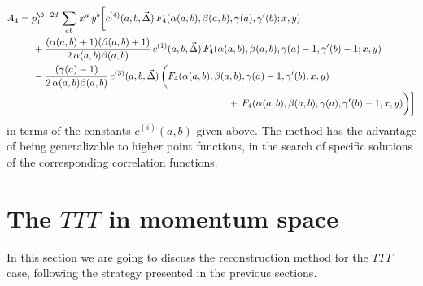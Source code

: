 \documentclass[a4paper,11pt,openright,twoside]{book}
\let\a=\alpha   \let\b=\beta   \let\g=\gamma   \let\d=\delta
\numberwithin{equation}{section}
\begin{document}
{{{\begin{align}
\end{align}
\begin{align}
	A_4&=p_1^{\D-2d}\,\sum_{ab}\,x^a\,y^b\bigg[c^{(4)}(a,b,\vec{\Delta})\,F_4(\a(a,b),\b(a,b),\g(a),\g'(b);x,y)\notag\\
	&\hspace{0.5cm}+\frac{(\a(a,b)+1)(\b(a,b)+1)}{2\,\a(a,b)\b(a,b)}\,c^{(1)}(a,b,\vec{\Delta})\,F_4(\a(a,b),\b(a,b),\g(a)-1,\g'(b)-1;x,y)\notag\\
	&\hspace{0.5cm}-\frac{(\g(a)-1)}{2\,\a(a,b)\b(a,b)}\,c^{(3)}(a,b,\vec{\Delta})\,\bigg(F_4(\alpha(a,b),\beta(a,b),\gamma(a)-1,\gamma'(b),x,y)\notag\\
	&\hspace{7.5cm}+\,F_4(\alpha(a,b),\beta(a,b),\gamma(a),\gamma'(b)-1,x,y)\bigg)
	\bigg]
\end{align}
in terms of the constants $c^{(i)}(a,b)$ given above. The method has the advantage of being generalizable to higher point functions, 
in the search of specific solutions of the corresponding correlation functions.

\section{The $TTT$ in momentum space}\label{secTTTgen}
In this section we are going to discuss the reconstruction method for the $TTT$ case, following the strategy presented in the previous sections. 
}}}
\end{document}
